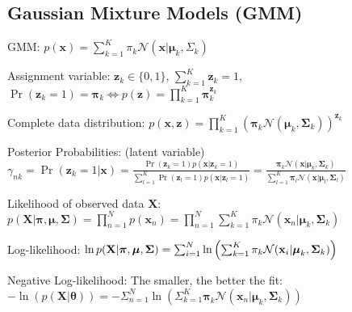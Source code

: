 \documentclass[a4paper, 11pt, landscape]{article}
\begin{document}
\begin{multicols*}{3}
\section{Gaussian Mixture Models (GMM)}
\begin{compactdesc}
	\item[GMM:] $p(\mathbf{x}) = \sum_{k=1}^K \pi_k \mathcal{N}(\mathbf{x} | \boldsymbol{\mu}_k, \Sigma_k)$
	\item[Assignment variable:] $\mathbf{z}_k \in \{0, 1\}$, $\sum_{k=1}^K \mathbf{z}_k = 1$, $\operatorname{Pr}(\mathbf{z}_k = 1) = \boldsymbol{\pi}_k \Leftrightarrow p(\mathbf{z}) = \prod_{k=1}^K \boldsymbol{\pi}_k^{\mathbf{z}_k}$
	\item[Complete data distribution:] $p(\mathbf{x}, \mathbf{z}) = \prod_{k=1}^K \left( \boldsymbol{\pi}_k \mathcal{N}(\boldsymbol{\mu}_k, \boldsymbol{\Sigma}_k) \right)^{\mathbf{z}_k}$
	\item[Posterior Probabilities:] (latent variable) \\$\gamma_{nk} = \operatorname{Pr}(\mathbf{z}_k = 1 | \mathbf{x}) = \frac{\operatorname{Pr}(\mathbf{z}_k = 1) p(\mathbf{x} | \mathbf{z}_k = 1)}{\sum_{l=1}^K \operatorname{Pr}(\mathbf{z}_l = 1) p(\mathbf{x} | \mathbf{z}_l = 1)} = \frac{\boldsymbol{\pi}_k \mathcal{N}(\mathbf{x} | \boldsymbol{\mu}_k, \boldsymbol{\Sigma}_k)}{\sum_{l=1}^K \boldsymbol{\pi}_l \mathcal{N}(\mathbf{x} | \boldsymbol{\mu}_l, \boldsymbol{\Sigma}_l)}$
	\item[Likelihood of observed data $\mathbf{X}$:] $p(\mathbf{X} | \boldsymbol{\pi}, \boldsymbol{\mu}, \boldsymbol{\Sigma}) = \prod_{n=1}^N p(\mathbf{x}_n) = \prod_{n=1}^N \sum_{k=1}^K \pi_k \mathcal{N}(\mathbf{x}_n | \boldsymbol{\mu}_k, \boldsymbol{\Sigma}_k)$
	\item[Log-likelihood:] $\ln p(\mathbf{X} | \boldsymbol{\pi}, \boldsymbol{\mu}, \boldsymbol{\Sigma}) =\break \sum_{i=1}^N \ln \left( \sum_{k=1}^K \pi_k \mathcal{N}(\mathbf{x}_i | \boldsymbol{\mu}_k, \boldsymbol{\Sigma}_k) \right)$
	\item[Negative Log-likelihood:] The smaller, the better the fit: $-\ln(p(\mathbf{X} | \mathbf{\theta})) = -\Sigma_{n=1}^N \ln\left( \Sigma_{k=1}^K \boldsymbol{\pi}_k \mathcal{N}(\mathbf{x}_n | \boldsymbol{\mu}_k, \boldsymbol{\Sigma}_k) \right)$
\end{compactdesc}


\end{multicols*}
\end{document}
